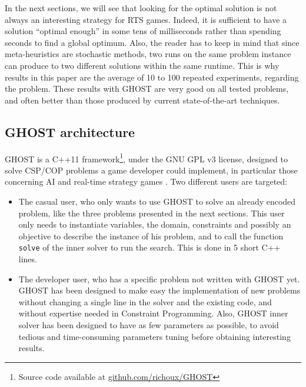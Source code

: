 \documentclass[journal]{IEEEtran}
\newcommand{\minormod}[1]{\color{red} #1\color{black} \xspace}
\newcommand{\csp}{\textsc{CSP}\xspace}
\newcommand{\cop}{\textsc{COP}\xspace}
\newcommand{\ghost}{\textsc{GHOST}\xspace}
\begin{document}
In  the next  sections,  we  will see  that  looking  for the  optimal
solution is not always an  interesting strategy for RTS games. Indeed,
it is sufficient to have a solution ``optimal enough'' in some tens of
milliseconds   rather  than   spending  seconds   to  find   a  global
optimum. Also, the reader has to keep in mind that since meta-heuristics are
stochastic methods, two runs on the same  problem instance can produce
to  two different  solutions within  the  same runtime.   This is  why
results  in  this  paper  are  the  average  of  10  to  100  repeated
experiments,  regarding the  problem.  These  results with  \ghost are
very good on  all tested problems, and often  better than those produced 
by current state­-of­-the-­art techniques.

\subsection{\ghost architecture}

\ghost  is a  C++11 framework\footnote{Source  code available  at
  \href{https://github.com/richoux/GHOST}{github.com/richoux/GHOST}},
under  the  GNU  GPL  v3  license,  designed  to  solve  \minormod{\csp/\cop problems a game developer could implement, in particular those concerning AI and real-time strategy games}. Two different users are targeted:
\begin{itemize}
\item  The casual  user, who  only  wants to  use \ghost  to solve  an
  already encoded problem,  like the three problems  presented in the next
  sections.   This  user  only  needs to  instantiate  variables,  the
  domain,  constraints and possibly  an objective  to describe  the
  instance of his problem, and  to call the function \texttt{solve} of
  the inner solver to run the search. This is done in 5 short C++ lines.
\item The developer user, who has  a specific problem not written with
  \ghost yet.  \ghost  has been designed to make easy the implementation of
  new problems without changing a single line in  the solver and
  the  existing  code,  and  without expertise  needed  in  Constraint
  Programming.   Also, \ghost inner  solver has  been designed  to have  as few
  parameters  as   possible,  to  avoid  tedious   and  time-consuming
  parameters tuning before obtaining interesting results.
\end{itemize}
\end{document}
